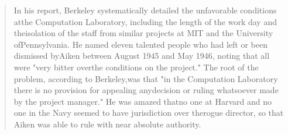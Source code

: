 \begin{quotation}
    In his report, Berkeley systematically detailed the unfavorable conditions atthe Computation Laboratory, including the length of the work day and theisolation of the staff from similar projects at MIT and the University ofPennsylvania. He named eleven talented people who had left or been dismissed byAiken between August 1945 and May 1946, noting that all were "very bitter overthe conditions on the project." The root of the problem, according to Berkeley,was that "in the Computation Laboratory there is no provision for appealing anydecision or ruling whatsoever made by the project manager." He was amazed thatno one at Harvard and no one in the Navy seemed to have jurisdiction over therogue director, so that Aiken was able to rule with near absolute authority.
\end{quotation}

